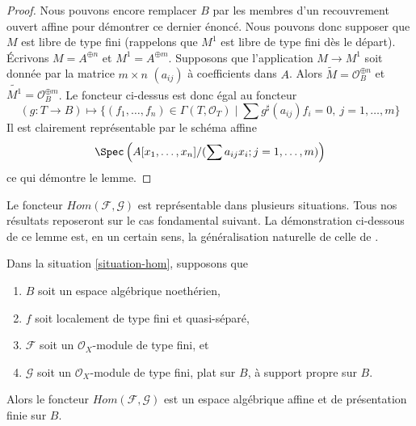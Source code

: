 \begin{proof}
\medskip\noindent
Nous pouvons encore remplacer $B$ par les membres d'un recouvrement ouvert
affine pour démontrer ce dernier énoncé. Nous pouvons donc supposer que $M$
est libre de type fini (rappelons que $M^1$ est libre de type fini dès le
départ). Écrivons $M = A^{\oplus n}$ et $M^1 = A^{\oplus m}$. Supposons que
l'application $M \to M^1$ soit donnée par la matrice $m \times n$
$(a_{ij})$ à coefficients dans $A$. Alors
$\widetilde{M} = \mathcal{O}_B^{\oplus n}$ et
$\widetilde{M^1} = \mathcal{O}_B^{\oplus m}$. Le foncteur ci-dessus est donc
égal au foncteur
$$
(g : T \to B) \longmapsto
\{(f_1, \ldots, f_n) \in \Gamma(T, \mathcal{O}_T) \mid
\sum g^\sharp(a_{ij})f_i = 0,\ j = 1, \ldots, m\}
$$
Il est clairement représentable par le schéma affine
$$
\Spec\left(A[x_1, \ldots, x_n]/(\sum a_{ij}x_i; j = 1, \ldots, m)\right)
$$
ce qui démontre le lemme.
\end{proof}

\noindent
Le foncteur $\mathit{Hom}(\mathcal{F}, \mathcal{G})$ est représentable dans
plusieurs situations. Tous nos résultats reposeront sur le cas fondamental
suivant. La démonstration ci-dessous de ce lemme est, en un certain sens, la
généralisation naturelle de celle de \cite[III, cor. 7.7.8]{EGA}.

\begin{lemma}
\label{lemma-noetherian-hom}
Dans la situation \ref{situation-hom}, supposons que
\begin{enumerate}
\item $B$ soit un espace algébrique noethérien,
\item $f$ soit localement de type fini et quasi-séparé,
\item $\mathcal{F}$ soit un $\mathcal{O}_X$-module de type fini, et
\item $\mathcal{G}$ soit un $\mathcal{O}_X$-module de type fini, plat sur
$B$, à support propre sur $B$.
\end{enumerate}
Alors le foncteur $\mathit{Hom}(\mathcal{F}, \mathcal{G})$ est un espace
algébrique affine et de présentation finie sur $B$.
\end{lemma}

